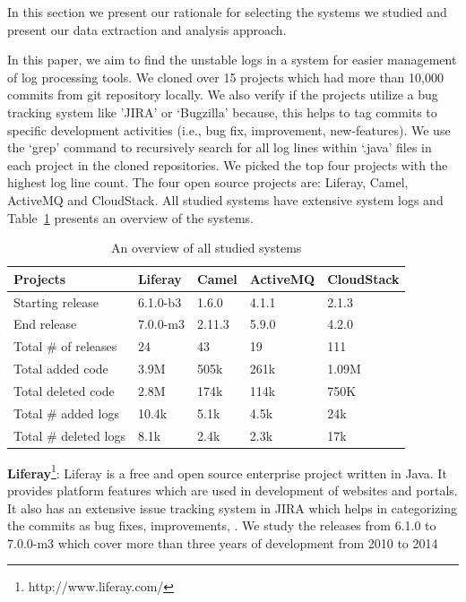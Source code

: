 In this section we present our rationale for selecting the systems we studied and present our data extraction and analysis approach.


In this paper, we aim to find the unstable logs in a system for easier management of log processing tools. We cloned over 15 projects which had more than 10,000 commits from git repository locally. We also verify if the projects utilize a bug tracking system like 'JIRA' or `Bugzilla' because, this helps to tag commits to specific development activities (i.e., bug fix, improvement, new-features). We use the `grep' command to recursively search for all log lines within `.java' files in each project in the cloned repositories. We picked the top four projects with the highest log line count. The four open source projects are: Liferay, Camel, ActiveMQ and CloudStack. All studied systems have extensive system logs and Table~\ref{tba:overviewsystems} presents an overview of the systems.

\begin{table}[tbh]
\centering \protect\caption{An overview of all studied systems}


\label{tba:overviewsystems} %
\begin{tabular}{lllll}
\hline 
Projects  & Liferay  & Camel  & ActiveMQ  & CloudStack \tabularnewline
\hline 
Starting release  & 6.1.0-b3  & 1.6.0  & 4.1.1  & 2.1.3 \tabularnewline
End release  &7.0.0-m3  & 2.11.3  & 5.9.0  & 4.2.0 \tabularnewline
Total \# of releases   & 24  & 43  & 19 & 111 \tabularnewline
Total added code  & 3.9M  & 505k  & 261k  & 1.09M \tabularnewline
Total deleted code  & 2.8M  & 174k  & 114k  & 750K \tabularnewline
Total \# added logs  & 10.4k  & 5.1k  & 4.5k  & 24k \tabularnewline
Total \# deleted logs  & 8.1k  & 2.4k  & 2.3k  & 17k \tabularnewline
\hline 
\end{tabular}
\end{table}

\textbf{Liferay}\footnote[1]{http://www.liferay.com/}:  Liferay is a free and open source enterprise project written in Java. It provides platform features which are used in development of websites and portals.
  It also has an extensive issue tracking system in JIRA which helps in categorizing the commits as bug fixes, improvements, . We study the releases from 6.1.0 to 7.0.0-m3 which cover more than three years of development from 2010 to 2014

